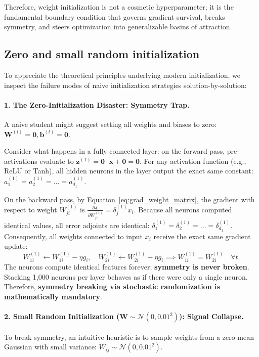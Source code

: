 Therefore, weight initialization is not a cosmetic hyperparameter; it is the fundamental boundary condition that governs gradient survival, breaks symmetry, and steers optimization into generalizable basins of attraction.

\subsection{Zero and small random initialization}
\label{sec:zero_init_trap}

To appreciate the theoretical principles underlying modern initialization, we inspect the failure modes of naive initialization strategies solution-by-solution:

\paragraph{1. The Zero-Initialization Disaster: Symmetry Trap.}
A naive student might suggest setting all weights and biases to zero: $\mathbf{W}^{(l)} = \mathbf{0}, \mathbf{b}^{(l)} = \mathbf{0}$. 

Consider what happens in a fully connected layer: on the forward pass, pre-activations evaluate to $\mathbf{z}^{(1)} = \mathbf{0} \cdot \mathbf{x} + \mathbf{0} = \mathbf{0}$. For any activation function (e.g., ReLU or Tanh), all hidden neurons in the layer output the exact same constant: $a_1^{(1)} = a_2^{(1)} = \dots = a_{d_1}^{(1)}$.

On the backward pass, by Equation~\eqref{eq:grad_weight_matrix}, the gradient with respect to weight $W_{ji}^{(1)}$ is $\frac{\partial \mathcal{L}}{\partial W_{ji}^{(1)}} = \delta_j^{(1)} x_i$. Because all neurons computed identical values, all error adjoints are identical: $\delta_1^{(1)} = \delta_2^{(1)} = \dots = \delta_{d_1}^{(1)}$. Consequently, all weights connected to input $x_i$ receive the exact same gradient update:
\begin{equation}
W_{1i}^{(1)} \leftarrow W_{1i}^{(1)} - \eta g_i, \quad W_{2i}^{(1)} \leftarrow W_{2i}^{(1)} - \eta g_i \implies W_{1i}^{(1)} = W_{2i}^{(1)} \quad \forall t.
\end{equation}
The neurons compute identical features forever; \textbf{symmetry is never broken}. Stacking 1,000 neurons per layer behaves as if there were only a single neuron. Therefore, \textbf{symmetry breaking via stochastic randomization is mathematically mandatory}.

\paragraph{2. Small Random Initialization ($\mathbf{W} \sim \mathcal{N}(0, 0.01^2)$): Signal Collapse.}
To break symmetry, an intuitive heuristic is to sample weights from a zero-mean Gaussian with small variance: $W_{ij} \sim \mathcal{N}(0, 0.01^2)$. 

